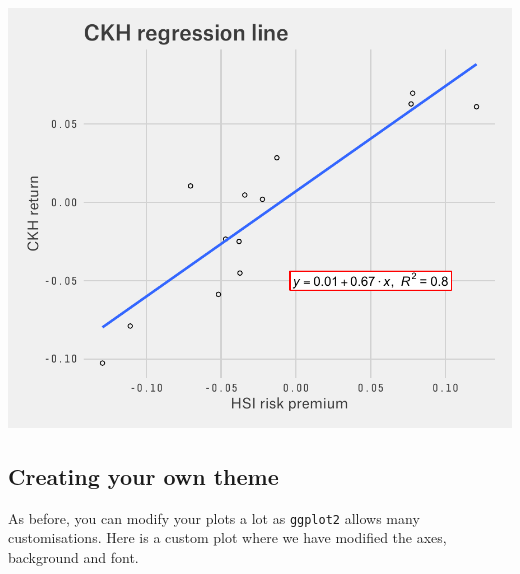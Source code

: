 \begin{center}\includegraphics[width=0.6\linewidth]{11_Linear_Regression_Plot_pdf/lr_17-1} \end{center}

\subsection{Creating your own theme}\label{creating-your-own-theme}

As before, you can modify your plots a lot as \texttt{ggplot2} allows
many customisations. Here is a custom plot where we have modified the
axes, background and font.

